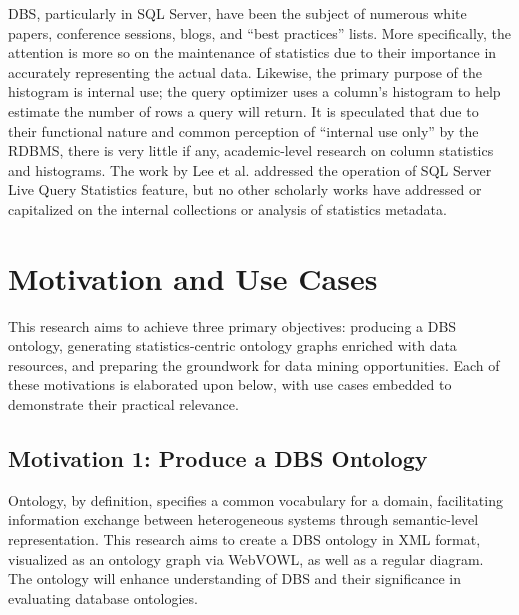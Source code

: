 \documentclass[sigconf]{acmart}
\begin{document}
DBS, particularly in SQL Server, have been the subject of numerous white papers, conference sessions, blogs, and “best practices” lists. More specifically, the attention is more so on the maintenance of statistics due to their importance in accurately representing the actual data. Likewise, the primary purpose of the histogram is internal use; the query optimizer uses a column’s histogram to help estimate the number of rows a query will return. It is speculated that due to their functional nature and common perception of “internal use only” by the RDBMS, there is very little if any, academic-level research on column statistics and histograms. The work by Lee et al. \cite{lee2016operator} addressed the operation of SQL Server Live Query Statistics feature, but no other scholarly works have addressed or capitalized on the internal collections or analysis of statistics metadata.

\section{Motivation and Use Cases}

This research aims to achieve three primary objectives: producing a DBS ontology, generating statistics-centric ontology graphs enriched with data resources, and preparing the groundwork for data mining opportunities. Each of these motivations is elaborated upon below, with use cases embedded to demonstrate their practical relevance.

\subsection{Motivation 1: Produce a DBS Ontology}
Ontology, by definition, specifies a common vocabulary for a domain, facilitating information exchange between heterogeneous systems through semantic-level representation. This research aims to create a DBS ontology in XML format, visualized as an ontology graph via WebVOWL, as well as a regular diagram. The ontology will enhance understanding of DBS and their significance in evaluating database ontologies.
\end{document}
